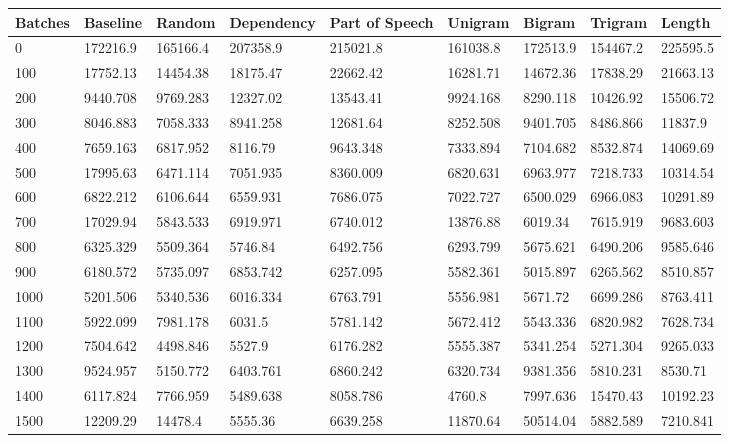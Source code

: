 \documentclass [11pt, proquest] {uwthesis}[2020/12/20]
\begin{document}
\begin{table}
\begin{tiny}
\centering
\begin{tabular}{|l|l|l|l|l|l|l|l|l|}
\hline
Batches & Baseline & Random & Dependency & Part of Speech & Unigram & Bigram & Trigram & Length \\ \hline
0 & 172216.9 & 165166.4 & 207358.9 & 215021.8 & 161038.8 & 172513.9 & 154467.2 & 225595.5 \\ \hline
100 & 17752.13 & 14454.38 & 18175.47 & 22662.42 & 16281.71 & 14672.36 & 17838.29 & 21663.13 \\ \hline
200 & 9440.708 & 9769.283 & 12327.02 & 13543.41 & 9924.168 & 8290.118 & 10426.92 & 15506.72 \\ \hline
300 & 8046.883 & 7058.333 & 8941.258 & 12681.64 & 8252.508 & 9401.705 & 8486.866 & 11837.9 \\ \hline
400 & 7659.163 & 6817.952 & 8116.79 & 9643.348 & 7333.894 & 7104.682 & 8532.874 & 14069.69 \\ \hline
500 & 17995.63 & 6471.114 & 7051.935 & 8360.009 & 6820.631 & 6963.977 & 7218.733 & 10314.54 \\ \hline
600 & 6822.212 & 6106.644 & 6559.931 & 7686.075 & 7022.727 & 6500.029 & 6966.083 & 10291.89 \\ \hline
700 & 17029.94 & 5843.533 & 6919.971 & 6740.012 & 13876.88 & 6019.34 & 7615.919 & 9683.603 \\ \hline
800 & 6325.329 & 5509.364 & 5746.84 & 6492.756 & 6293.799 & 5675.621 & 6490.206 & 9585.646 \\ \hline
900 & 6180.572 & 5735.097 & 6853.742 & 6257.095 & 5582.361 & 5015.897 & 6265.562 & 8510.857 \\ \hline
1000 & 5201.506 & 5340.536 & 6016.334 & 6763.791 & 5556.981 & 5671.72 & 6699.286 & 8763.411 \\ \hline
1100 & 5922.099 & 7981.178 & 6031.5 & 5781.142 & 5672.412 & 5543.336 & 6820.982 & 7628.734 \\ \hline
1200 & 7504.642 & 4498.846 & 5527.9 & 6176.282 & 5555.387 & 5341.254 & 5271.304 & 9265.033 \\ \hline
1300 & 9524.957 & 5150.772 & 6403.761 & 6860.242 & 6320.734 & 9381.356 & 5810.231 & 8530.71 \\ \hline
1400 & 6117.824 & 7766.959 & 5489.638 & 8058.786 & 4760.8 & 7997.636 & 15470.43 & 10192.23 \\ \hline
1500 & 12209.29 & 14478.4 & 5555.36 & 6639.258 & 11870.64 & 50514.04 & 5882.589 & 7210.841 \\ \hline

\end{tabular}
\end{tiny}
\end{table}
\end{document}
